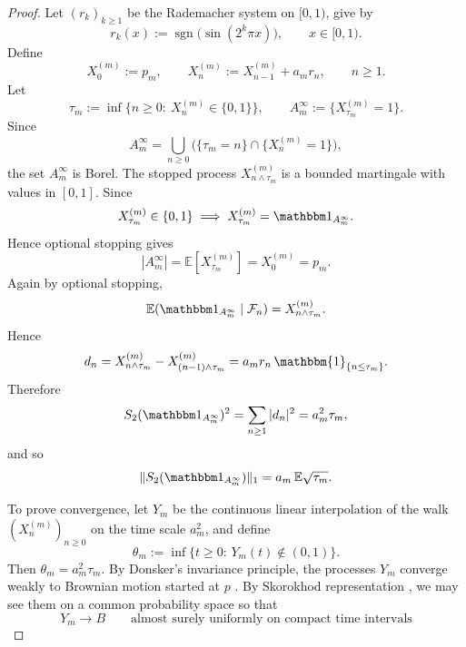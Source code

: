 \documentclass[11pt]{amsart}
\theoremstyle{definition}
\renewcommand{\1}{{\mathbbm{1}}}
\begin{document}
\begin{proof}
Let $(r_k)_{k\ge1}$ be the Rademacher system on {$[0,1)$}, give by
\[
  r_k(x) := \operatorname{sgn}\bigl(\sin(2^k \pi x)\bigr),
  \qquad x\in{[0,1)}.
\]
Define
\[
X_0^{(m)}:=p_m,\qquad
X_n^{(m)}:=X_{n-1}^{(m)}+a_m r_n,
\qquad n\ge1.
\]
Let
\[
\tau_m:=\inf\{n\ge0:\ X_n^{(m)}\in\{0,1\}\},
\qquad
A_m^\infty:=\{X_{\tau_m}^{(m)}=1\}.
\]
Since
\[
A_m^\infty=\bigcup_{n\ge0}\bigl(\{\tau_m=n\}\cap\{X_n^{(m)}=1\}\bigr),
\]
the set $A_m^\infty$ is Borel.
The stopped process $X_{n\wedge\tau_m}^{(m)}$ is a bounded martingale with values in $[0,1]$. Since
\[
X_{\tau_m}^{(m)}\in\{0,1\}
\implies
X_{\tau_m}^{(m)}=\mathbbm 1_{A_m^\infty}.
\]
Hence optional stopping gives
\[
|A_m^\infty|
=
\mathbb E[X_{\tau_m}^{(m)}]
=
X_0^{(m)}
=
p_m.
\]
Again by optional stopping,
\[
\mathbb E(\mathbbm 1_{A_m^\infty}\mid\mathcal F_n)=X_{n\wedge\tau_m}^{(m)}.
\]
Hence
\[
d_n
=
X_{n\wedge\tau_m}^{(m)}-X_{(n-1)\wedge\tau_m}^{(m)}
=
a_m r_n\,\mathbbm{1}_{\{n\le\tau_m\}}.
\]
Therefore
\[
S_2(\mathbbm 1_{A_m^\infty})^2
=
\sum_{n\ge1}|d_n|^2
=
a_m^2\tau_m,
\]
and so
\[
\|S_2(\mathbbm 1_{A_m^\infty})\|_1
=
a_m\,\mathbb E\sqrt{\tau_m}.
\]

To prove convergence, let $Y_m$ be the continuous linear interpolation of the walk $(X_n^{(m)})_{n\ge0}$ on the time scale $a_m^2$, and define
\[
\theta_m:=\inf\{t\ge0:\, Y_m(t)\notin(0,1)\}.
\]
Then $\theta_m=a_m^2\tau_m$. By Donsker's invariance principle, the processes $Y_m$ converge weakly to Brownian motion started at $p$ \cite{Durrett2019}. By Skorokhod representation \cite{Billingsley1999}, we may see them on a common probability space so that
\[
Y_m\to B
\qquad\text{almost surely uniformly on compact time intervals}
\]



\end{proof}
\end{document}

